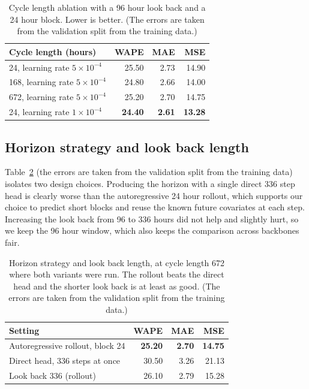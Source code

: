 \documentclass[11pt]{article}
\begin{document}
\begin{table}[h]
\centering
\begin{tabular}{lrrr}
\toprule
Cycle length (hours) & WAPE & MAE & MSE \\
\midrule
24, learning rate $5\times10^{-4}$ & 25.50 & 2.73 & 14.90 \\
168, learning rate $5\times10^{-4}$ & 24.80 & 2.66 & 14.00 \\
672, learning rate $5\times10^{-4}$ & 25.20 & 2.70 & 14.75 \\
24, learning rate $1\times10^{-4}$ & \textbf{24.40} & \textbf{2.61} & \textbf{13.28} \\
\bottomrule
\end{tabular}
\caption{Cycle length ablation with a 96 hour look back and a 24 hour block. Lower is better. 
(The errors are taken from the validation split from the training data.)}
\label{tab:cycle}
\end{table}

\subsection{Horizon strategy and look back length}
Table~\ref{tab:horizon} (the errors are taken from the validation split from the training data) 
isolates two design choices. Producing the horizon with a single direct
336 step head is clearly worse than the autoregressive 24 hour rollout, which supports our choice
to predict short blocks and reuse the known future covariates at each step. Increasing the look
back from 96 to 336 hours did not help and slightly hurt, so we keep the 96 hour window, which
also keeps the comparison across backbones fair.

\begin{table}[h]
\centering
\begin{tabular}{lrrr}
\toprule
Setting & WAPE & MAE & MSE \\
\midrule
Autoregressive rollout, block 24 & \textbf{25.20} & \textbf{2.70} & \textbf{14.75} \\
Direct head, 336 steps at once & 30.50 & 3.26 & 21.13 \\
Look back 336 (rollout) & 26.10 & 2.79 & 15.28 \\
\bottomrule
\end{tabular}
\caption{Horizon strategy and look back length, at cycle length 672 where both variants were
run. The rollout beats the direct head and the shorter look back is at least as good. 
(The errors are taken from the validation split from the training data.)}
\label{tab:horizon}
\end{table}
\end{document}

